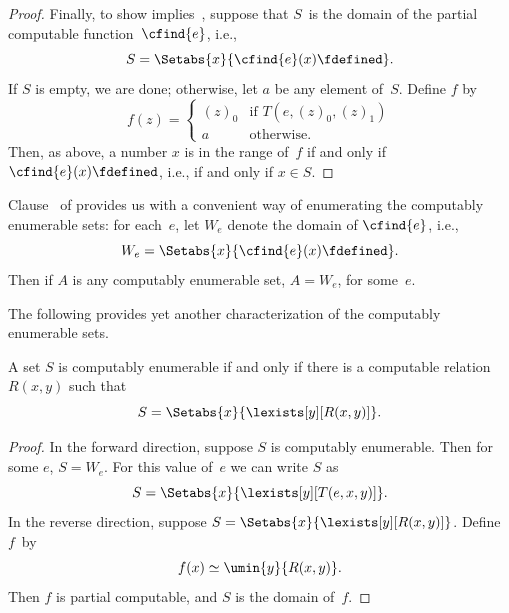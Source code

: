 \documentclass[../../../include/open-logic-section]{subfiles}
\begin{document}
\begin{proof}
Finally, to show  implies~,
suppose that $S$~is the domain of the partial computable
function~$\cfind{e}$, i.e.,
\[
S = \Setabs{x}{\cfind{e}(x) \fdefined}.
\]
If $S$ is empty, we are done; otherwise, let $a$ be any element
of~$S$. Define $f$ by
\[
f(z) = \begin{cases}
(z)_0 & \text{if $T(e,(z)_0,(z)_1)$} \\
a & \text{otherwise.}
\end{cases}
\]
Then, as above, a number $x$ is in the range of~$f$ if and only if
$\cfind{e}(x) \fdefined$, i.e., if and only if $x \in S$. 
\end{proof}

Clause~ of  provides us with
a convenient way of enumerating the computably enumerable sets: for
each~$e$, let $W_e$ denote the domain of $\cfind{e}$, i.e.,
\[
W_e = \Setabs{x}{\cfind{e}(x) \fdefined}.
\] 
Then if $A$ is any computably enumerable set, $A = W_e$, for some~$e$.

The following provides yet another characterization of the computably
enumerable sets.

\begin{thm}
A set $S$ is computably enumerable if and only if there is a
computable relation $R(x,y)$ such that
\[
S = \Setabs{ x }{ \lexists[y][R(x,y)] }.
\]
\end{thm}

\begin{proof}
In the forward direction, suppose $S$ is computably
enumerable. Then for some $e$, $S = W_e$. For this value of~$e$
we can write $S$ as
\[
S = \Setabs{ x }{ \lexists[y][T(e, x, y)] }.
\]
In the reverse direction, suppose $S = \Setabs{ x }{
  \lexists[y][R(x, y)] }$. Define $f$~by
\[
f(x) \simeq \umin{y}{R(x, y)}.
\]
Then $f$ is partial computable, and $S$ is the domain of~$f$.
\end{proof}
\end{document}
